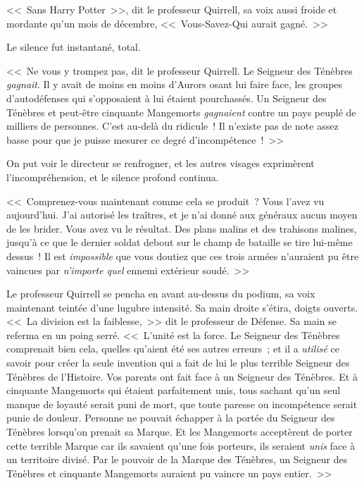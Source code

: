 <<~Sans Harry Potter~>>, dit le professeur Quirrell, sa voix aussi froide et mordante qu'un mois de décembre, <<~Vous-Savez-Qui aurait gagné.~>>

Le silence fut instantané, total.

\later

<<~Ne vous y trompez pas, dit le professeur Quirrell. Le Seigneur des Ténèbres \emph{gagnait}. Il y avait de moins en moins d'Aurors osant lui faire face, les groupes d'autodéfenses qui s'opposaient à lui étaient pourchassés. Un Seigneur des Ténèbres et peut-être cinquante Mangemorts \emph{gagnaient} contre un pays peuplé de milliers de personnes. C'est au-delà du ridicule~! Il n'existe pas de note assez basse pour que je puisse mesurer ce degré d'incompétence~!~>>

On put voir le directeur se renfrogner, et les autres visages exprimèrent l'incompréhension, et le silence profond continua.

<<~Comprenez-vous maintenant comme cela se produit~? Vous l'avez vu aujourd'hui. J'ai autorisé les traîtres, et je n'ai donné aux généraux aucun moyen de les brider. Vous avez vu le résultat. Des plans malins et des trahisons malines, jusqu'à ce que le dernier soldat debout sur le champ de bataille se tire lui-même dessus~! Il est \emph{impossible} que vous doutiez que ces trois armées n'auraient pu être vaincues par \emph{n'importe quel} ennemi extérieur soudé.~>>

Le professeur Quirrell se pencha en avant au-dessus du podium, sa voix maintenant teintée d'une lugubre intensité. Sa main droite s'étira, doigts ouverts. <<~La division est la faiblesse,~>> dit le professeur de Défense. Sa main se referma en un poing serré. <<~L'unité est la force. Le Seigneur des Ténèbres comprenait bien cela, quelles qu'aient été ses autres erreurs~; et il a \emph{utilisé} ce savoir pour créer la seule invention qui a fait de lui le plus terrible Seigneur des Ténèbres de l'Histoire. Vos parents ont fait face à un Seigneur des Ténèbres. Et à cinquante Mangemorts qui étaient parfaitement unis, tous sachant qu'un seul manque de loyauté serait puni de mort, que toute paresse ou incompétence serait punie de douleur. Personne ne pouvait échapper à la portée du Seigneur des Ténèbres lorsqu'on prenait sa Marque. Et les Mangemorts acceptèrent de porter cette terrible Marque car ils savaient qu'une fois porteurs, ils seraient \emph{unis} face à un territoire divisé. Par le pouvoir de la Marque des Ténèbres, un Seigneur des Ténèbres et cinquante Mangemorts auraient pu vaincre un pays entier.~>>

